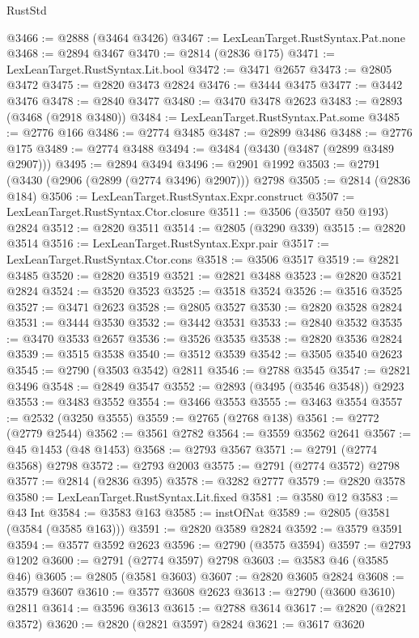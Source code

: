 \begin{lexlean}{RustStd}
\begin{coremodule}
@3466 := @2888 (@3464 @3426)
@3467 := LexLeanTarget.RustSyntax.Pat.none
@3468 := @2894 @3467
@3470 := @2814 (@2836 @175)
@3471 := LexLeanTarget.RustSyntax.Lit.bool
@3472 := @3471 @2657
@3473 := @2805 @3472
@3475 := @2820 @3473 @2824
@3476 := @3444 @3475
@3477 := @3442 @3476
@3478 := @2840 @3477
@3480 := @3470 @3478 @2623
@3483 := @2893 (@3468 (@2918 @3480))
@3484 := LexLeanTarget.RustSyntax.Pat.some
@3485 := @2776 @166
@3486 := @2774 @3485
@3487 := @2899 @3486
@3488 := @2776 @175
@3489 := @2774 @3488
@3494 := @3484 (@3430 (@3487 (@2899 @3489 @2907)))
@3495 := @2894 @3494
@3496 := @2901 @1992
@3503 := @2791 (@3430 (@2906 (@2899 (@2774 @3496) @2907))) @2798
@3505 := @2814 (@2836 @184)
@3506 := LexLeanTarget.RustSyntax.Expr.construct
@3507 := LexLeanTarget.RustSyntax.Ctor.closure
@3511 := @3506 (@3507 @50 @193) @2824
@3512 := @2820 @3511
@3514 := @2805 (@3290 @339)
@3515 := @2820 @3514
@3516 := LexLeanTarget.RustSyntax.Expr.pair
@3517 := LexLeanTarget.RustSyntax.Ctor.cons
@3518 := @3506 @3517
@3519 := @2821 @3485
@3520 := @2820 @3519
@3521 := @2821 @3488
@3523 := @2820 @3521 @2824
@3524 := @3520 @3523
@3525 := @3518 @3524
@3526 := @3516 @3525
@3527 := @3471 @2623
@3528 := @2805 @3527
@3530 := @2820 @3528 @2824
@3531 := @3444 @3530
@3532 := @3442 @3531
@3533 := @2840 @3532
@3535 := @3470 @3533 @2657
@3536 := @3526 @3535
@3538 := @2820 @3536 @2824
@3539 := @3515 @3538
@3540 := @3512 @3539
@3542 := @3505 @3540 @2623
@3545 := @2790 (@3503 @3542) @2811
@3546 := @2788 @3545
@3547 := @2821 @3496
@3548 := @2849 @3547
@3552 := @2893 (@3495 (@3546 @3548)) @2923
@3553 := @3483 @3552
@3554 := @3466 @3553
@3555 := @3463 @3554
@3557 := @2532 (@3250 @3555)
@3559 := @2765 (@2768 @138)
@3561 := @2772 (@2779 @2544)
@3562 := @3561 @2782
@3564 := @3559 @3562 @2641
@3567 := @45 @1453 (@48 @1453)
@3568 := @2793 @3567
@3571 := @2791 (@2774 @3568) @2798
@3572 := @2793 @2003
@3575 := @2791 (@2774 @3572) @2798
@3577 := @2814 (@2836 @395)
@3578 := @3282 @2777
@3579 := @2820 @3578
@3580 := LexLeanTarget.RustSyntax.Lit.fixed
@3581 := @3580 @12
@3583 := @43 Int
@3584 := @3583 @163
@3585 := instOfNat
@3589 := @2805 (@3581 (@3584 (@3585 @163)))
@3591 := @2820 @3589 @2824
@3592 := @3579 @3591
@3594 := @3577 @3592 @2623
@3596 := @2790 (@3575 @3594)
@3597 := @2793 @1202
@3600 := @2791 (@2774 @3597) @2798
@3603 := @3583 @46 (@3585 @46)
@3605 := @2805 (@3581 @3603)
@3607 := @2820 @3605 @2824
@3608 := @3579 @3607
@3610 := @3577 @3608 @2623
@3613 := @2790 (@3600 @3610) @2811
@3614 := @3596 @3613
@3615 := @2788 @3614
@3617 := @2820 (@2821 @3572)
@3620 := @2820 (@2821 @3597) @2824
@3621 := @3617 @3620

\end{coremodule}
\end{lexlean}
